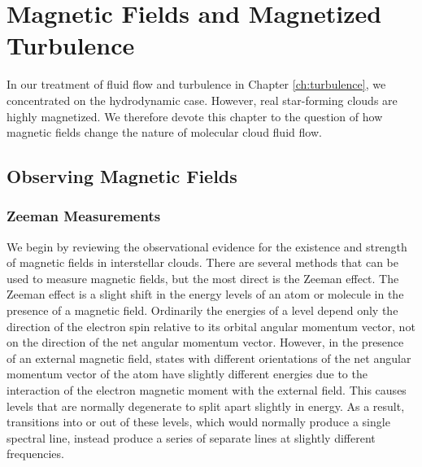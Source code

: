 \chapter{Magnetic Fields and Magnetized Turbulence}
\label{ch:magnetic}


In our treatment of fluid flow and turbulence in Chapter \ref{ch:turbulence}, we concentrated on the hydrodynamic case. However, real star-forming clouds are highly magnetized. We therefore devote this chapter to the question of how magnetic fields change the nature of molecular cloud fluid flow.

\section{Observing Magnetic Fields}

\subsection{Zeeman Measurements}

We begin by reviewing the observational evidence for the existence and strength of magnetic fields in interstellar clouds. There are several methods that can be used to measure magnetic fields, but the most direct is the Zeeman effect. The Zeeman effect is a slight shift in the energy levels of an atom or molecule in the presence of a magnetic field. Ordinarily the energies of a level depend only the direction of the electron spin relative to its orbital angular momentum vector, not on the direction of the net angular momentum vector. However, in the presence of an external magnetic field, states with different orientations of the net angular momentum vector of the atom have slightly different energies due to the interaction of the electron magnetic moment with the external field. This causes levels that are normally degenerate to split apart slightly in energy. As a result, transitions into or out of these levels, which would normally produce a single spectral line, instead produce a series of separate lines at slightly different frequencies.

